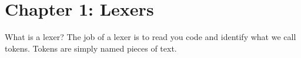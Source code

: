 \documentclass[a4paper,12pt]{book}
\begin{document}
\chapter{Chapter 1: Lexers}
What is a lexer? The job of a lexer is to read you code and identify what we call tokens. Tokens are simply named pieces of text.
\end{document}
